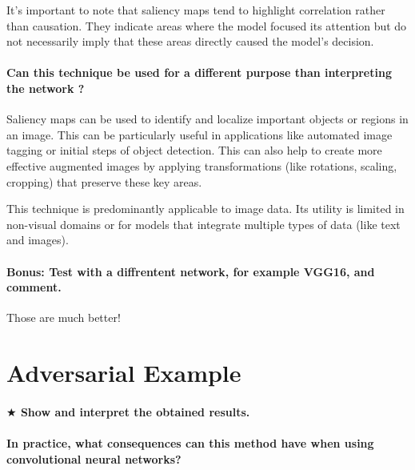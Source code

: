 It's important to note that saliency maps tend to highlight correlation rather than causation. They indicate areas where the model focused its attention but do not necessarily imply that these areas directly caused the model's decision.


\paragraph*{Can this technique be used for a different purpose than interpreting the network ?}
Saliency maps can be used to identify and localize important objects or regions in an image. This can be particularly useful in applications like automated image tagging or initial steps of object detection. This can also  help to create more effective augmented images by applying transformations (like rotations, scaling, cropping) that preserve these key areas.

This technique is predominantly applicable to image data. Its utility is limited in non-visual domains or for models that integrate multiple types of data (like text and images).


\paragraph*{\textbf{Bonus:} Test with a diffrentent network, for example VGG16, and comment.}
Those are much better! 


\section{Adversarial Example}
\paragraph*{$ \bigstar $ Show and interpret the obtained results.}
\paragraph*{In practice, what consequences can this method have when using convolutional neural networks?}

